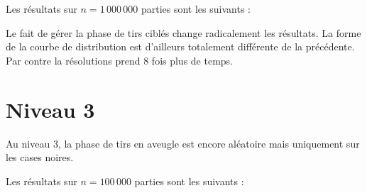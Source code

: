 Les résultats sur $n=1\,000\,000$ parties sont les suivants :

\begin{center}
\end{center}

Le fait de gérer la phase de tirs ciblés change radicalement les résultats. La forme de la courbe de distribution est d'ailleurs totalement différente de la précédente.\\
Par contre la résolutions prend 8 fois plus de temps.
\newpage
\section{Niveau 3}
Au niveau 3, la phase de tirs en aveugle est encore aléatoire mais uniquement sur les cases noires.

Les résultats sur $n=100\,000$ parties sont les suivants :

\begin{center}
\end{center}

